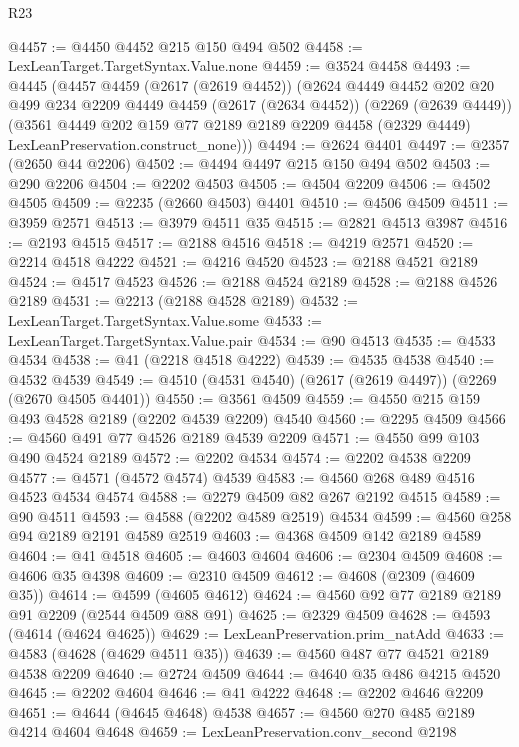 \begin{lexlean}{R23}
\begin{coremodule}
@4457 := @4450 @4452 @215 @150 @494 @502
@4458 := LexLeanTarget.TargetSyntax.Value.none
@4459 := @3524 @4458
@4493 := @4445
    (@4457
      @4459
      (@2617 (@2619 @4452))
      (@2624
        @4449
        @4452
        @202
        @20
        @499
        @234
        @2209
        @4449
        @4459
        (@2617 (@2634 @4452))
        (@2269 (@2639 @4449))
        (@3561
          @4449
          @202
          @159
          @77
          @2189
          @2189
          @2209
          @4458
          (@2329 @4449)
          LexLeanPreservation.construct_none)))
@4494 := @2624 @4401
@4497 := @2357 (@2650 @44 @2206)
@4502 := @4494 @4497 @215 @150 @494 @502
@4503 := @290 @2206
@4504 := @2202 @4503
@4505 := @4504 @2209
@4506 := @4502 @4505
@4509 := @2235 (@2660 @4503) @4401
@4510 := @4506 @4509
@4511 := @3959 @2571
@4513 := @3979 @4511 @35
@4515 := @2821 @4513 @3987
@4516 := @2193 @4515
@4517 := @2188 @4516
@4518 := @4219 @2571
@4520 := @2214 @4518 @4222
@4521 := @4216 @4520
@4523 := @2188 @4521 @2189
@4524 := @4517 @4523
@4526 := @2188 @4524 @2189
@4528 := @2188 @4526 @2189
@4531 := @2213 (@2188 @4528 @2189)
@4532 := LexLeanTarget.TargetSyntax.Value.some
@4533 := LexLeanTarget.TargetSyntax.Value.pair
@4534 := @90 @4513
@4535 := @4533 @4534
@4538 := @41 (@2218 @4518 @4222)
@4539 := @4535 @4538
@4540 := @4532 @4539
@4549 := @4510 (@4531 @4540) (@2617 (@2619 @4497)) (@2269 (@2670 @4505 @4401))
@4550 := @3561 @4509
@4559 := @4550 @215 @159 @493 @4528 @2189 (@2202 @4539 @2209) @4540
@4560 := @2295 @4509
@4566 := @4560 @491 @77 @4526 @2189 @4539 @2209
@4571 := @4550 @99 @103 @490 @4524 @2189
@4572 := @2202 @4534
@4574 := @2202 @4538 @2209
@4577 := @4571 (@4572 @4574) @4539
@4583 := @4560 @268 @489 @4516 @4523 @4534 @4574
@4588 := @2279 @4509 @82 @267 @2192 @4515
@4589 := @90 @4511
@4593 := @4588 (@2202 @4589 @2519) @4534
@4599 := @4560 @258 @94 @2189 @2191 @4589 @2519
@4603 := @4368 @4509 @142 @2189 @4589
@4604 := @41 @4518
@4605 := @4603 @4604
@4606 := @2304 @4509
@4608 := @4606 @35 @4398
@4609 := @2310 @4509
@4612 := @4608 (@2309 (@4609 @35))
@4614 := @4599 (@4605 @4612)
@4624 := @4560 @92 @77 @2189 @2189 @91 @2209 (@2544 @4509 @88 @91)
@4625 := @2329 @4509
@4628 := @4593 (@4614 (@4624 @4625))
@4629 := LexLeanPreservation.prim_natAdd
@4633 := @4583 (@4628 (@4629 @4511 @35))
@4639 := @4560 @487 @77 @4521 @2189 @4538 @2209
@4640 := @2724 @4509
@4644 := @4640 @35 @486 @4215 @4520
@4645 := @2202 @4604
@4646 := @41 @4222
@4648 := @2202 @4646 @2209
@4651 := @4644 (@4645 @4648) @4538
@4657 := @4560 @270 @485 @2189 @4214 @4604 @4648
@4659 := LexLeanPreservation.conv_second @2198

\end{coremodule}
\end{lexlean}
